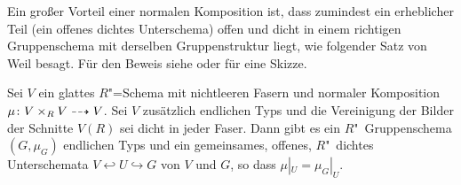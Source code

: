 Ein großer Vorteil einer normalen Komposition ist, dass zumindest
ein erheblicher Teil (ein offenes dichtes Unterschema) offen
und dicht in einem richtigen Gruppenschema mit derselben Gruppenstruktur
liegt, wie folgender Satz von Weil besagt. Für den Beweis siehe
\cite[Theorem~VIII.1.12]{artin} oder \cite[Theorem~IV.6.9]{silverman2}
für eine Skizze.
\begin{Theorem}[Weil]\label{thm:weil}
  Sei $V$ ein glattes $R$"=Schema mit nichtleeren Fasern
  und normaler Komposition $\mu\colon V\times_R V\dashrightarrow V$.
  Sei $V$ zusätzlich endlichen Typs und die Vereinigung der Bilder der
  Schnitte $V(R)$ sei dicht in jeder Faser. 
  Dann gibt es ein $R$"~Gruppenschema $(G,\mu_G)$ endlichen Typs und
  ein gemeinsames, offenes, $R$"~dichtes Unterschemata $V\hookleftarrow
  U\hookrightarrow G$ von $V$ und $G$, so dass $\mu|_U=\mu_G|_U$.
\end{Theorem}

